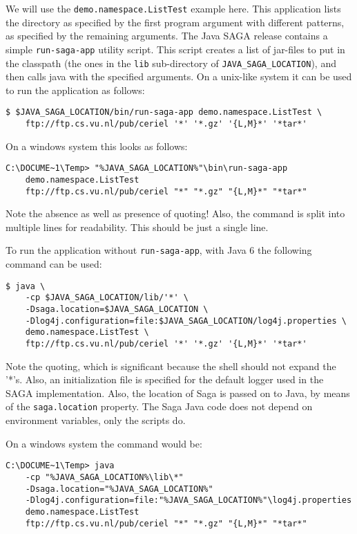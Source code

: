 \documentclass[a4paper,10pt]{article}
\begin{document}
We will use the \texttt{demo.namespace.ListTest} example here.
This application lists the directory as specified by the first
program argument with different patterns, as specified by the
remaining arguments.
The Java SAGA release contains a simple \texttt{run-saga-app} utility script.
This script creates a list of jar-files to put in the classpath (the
ones in the \texttt{lib} sub-directory of \texttt{JAVA\_SAGA\_LOCATION}),
and then calls java with the specified arguments.
On a unix-like system it can be used to run the application as follows:

\noindent
{\small
\begin{verbatim}
$ $JAVA_SAGA_LOCATION/bin/run-saga-app demo.namespace.ListTest \
    ftp://ftp.cs.vu.nl/pub/ceriel '*' '*.gz' '{L,M}*' '*tar*'
\end{verbatim}
}
\noindent

On a windows system this looks as follows:

\noindent
{\small
\begin{verbatim}
C:\DOCUME~1\Temp> "%JAVA_SAGA_LOCATION%"\bin\run-saga-app
    demo.namespace.ListTest
    ftp://ftp.cs.vu.nl/pub/ceriel "*" "*.gz" "{L,M}*" "*tar*"
\end{verbatim}
}
\noindent

Note the absence as well as presence of quoting! Also, the
command is split into multiple lines for readability.
This should be just a single line.

To run the application without \texttt{run-saga-app},
with Java 6 the following command can be used:

\noindent
{\small
\begin{verbatim}
$ java \
    -cp $JAVA_SAGA_LOCATION/lib/'*' \
    -Dsaga.location=$JAVA_SAGA_LOCATION \
    -Dlog4j.configuration=file:$JAVA_SAGA_LOCATION/log4j.properties \
    demo.namespace.ListTest \
    ftp://ftp.cs.vu.nl/pub/ceriel '*' '*.gz' '{L,M}*' '*tar*'
\end{verbatim}
}
\noindent

Note the quoting, which is significant because the shell should not expand
the '*'s. Also, an initialization file is specified for the default logger
used in the SAGA implementation.
Also, the location of Saga is passed on to Java, by means of the
\texttt{saga.location} property. The Saga Java code does not depend on
environment variables, only the scripts do.

On a windows system the command would be:

\noindent
{\small
\begin{verbatim}
C:\DOCUME~1\Temp> java
    -cp "%JAVA_SAGA_LOCATION%\lib\*"
    -Dsaga.location="%JAVA_SAGA_LOCATION%"
    -Dlog4j.configuration=file:"%JAVA_SAGA_LOCATION%"\log4j.properties
    demo.namespace.ListTest
    ftp://ftp.cs.vu.nl/pub/ceriel "*" "*.gz" "{L,M}*" "*tar*"
\end{verbatim}
}
\noindent
\end{document}
